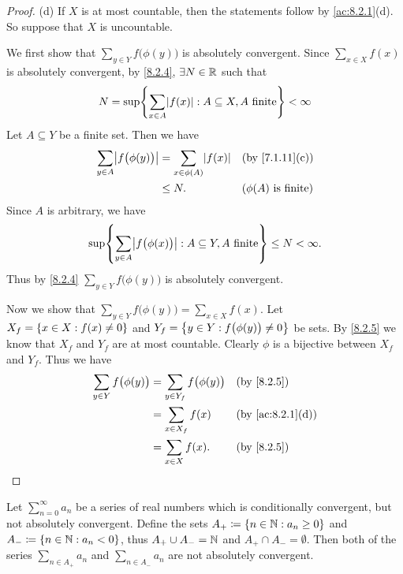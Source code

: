 \begin{proof}{(d)}
  If \(X\) is at most countable, then the statements follow by \cref{ac:8.2.1}(d).
  So suppose that \(X\) is uncountable.

  We first show that \(\sum_{y \in Y} f\big(\phi(y)\big)\) is absolutely convergent.
  Since \(\sum_{x \in X} f(x)\) is absolutely convergent, by \cref{8.2.4}, \(\exists N \in \mathbb{R}\) such that
  \[
    N = \sup\set{\sum_{x \in A} \abs{f(x)} : A \subseteq X, A \text{ finite}} < \infty
  \]
  Let \(A \subseteq Y\) be a finite set.
  Then we have
  \begin{align*}
    \sum_{y \in A} \abs{f\big(\phi(y)\big)} & = \sum_{x \in \phi(A)} \abs{f(x)} &  & \text{(by \cref{7.1.11}(c))}   \\
                                            & \leq N.                           &  & \text{(\(\phi(A)\) is finite)}
  \end{align*}
  Since \(A\) is arbitrary, we have
  \[
    \sup\set{\sum_{y \in A} \abs{f\big(\phi(x)\big)} : A \subseteq Y, A \text{ finite}} \leq N < \infty.
  \]
  Thus by \cref{8.2.4} \(\sum_{y \in Y} f\big(\phi(y)\big)\) is absolutely convergent.

  Now we show that \(\sum_{y \in Y} f\big(\phi(y)\big) = \sum_{x \in X} f(x)\).
  Let \(X_f = \left\lbrace x \in X : f(x) \neq 0\right\rbrace\) and \(Y_f = \left\lbrace y \in Y : f\big(\phi(y)\big) \neq 0\right\rbrace\) be sets.
  By \cref{8.2.5} we know that \(X_f\) and \(Y_f\) are at most countable.
  Clearly \(\phi\) is a bijective between \(X_f\) and \(Y_f\).
  Thus we have
  \begin{align*}
    \sum_{y \in Y} f\big(\phi(y)\big) & = \sum_{y \in Y_f} f\big(\phi(y)\big) &  & \by{8.2.5}                     \\
                                      & = \sum_{x \in X_f} f(x)               &  & \text{(by \cref{ac:8.2.1}(d))} \\
                                      & = \sum_{x \in X} f(x).                &  & \by{8.2.5}
  \end{align*}
\end{proof}

\begin{lem}\label{8.2.7}
  Let \(\sum_{n = 0}^\infty a_n\) be a series of real numbers which is conditionally convergent, but not absolutely convergent.
  Define the sets \(A_+ \coloneqq \left\lbrace n \in \mathbb{N} : a_n \geq 0\right\rbrace\) and \(A_- \coloneqq \left\lbrace n \in \mathbb{N} : a_n < 0\right\rbrace\), thus \(A_+ \cup A_- = \mathbb{N}\) and \(A_+ \cap A_- = \emptyset\).
  Then both of the series \(\sum_{n \in A_+} a_n\) and \(\sum_{n \in A_-} a_n\) are not absolutely convergent.
\end{lem}

